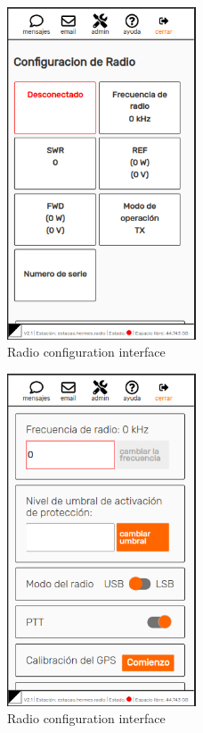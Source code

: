 \documentclass[11pt,a4paper]{article}
\begin{document}
\begin{figure}[H]
    \centering
    \includegraphics[width=0.5\textwidth]{screenshots/frontend/es/radioconfig.png}
    \caption{Radio configuration interface}
	\vspace{-10pt}
    \label{fig:radioconf}
\end{figure}    

\begin{figure}[H]
    \centering
    \includegraphics[width=0.5\textwidth]{screenshots/frontend/es/radioconfig2.png}
    \caption{Radio configuration interface}
	\vspace{-10pt}
    \label{fig:radioconf2}
\end{figure}
\end{document}
